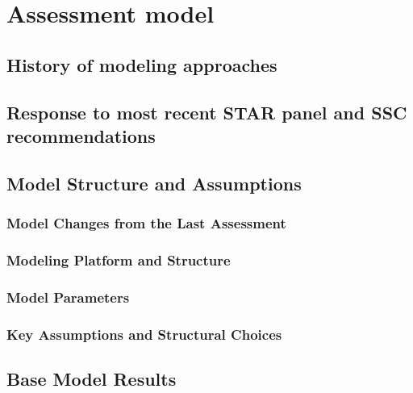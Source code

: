 \documentclass[
]{scrartcl}
\begin{document}
\newpage{}

\section{Assessment model}\label{assessment-model}

\subsection{History of modeling
approaches}\label{history-of-modeling-approaches}

\subsection{Response to most recent STAR panel and SSC
recommendations}\label{response-to-most-recent-star-panel-and-ssc-recommendations}

\subsection{Model Structure and
Assumptions}\label{model-structure-and-assumptions}

\subsubsection{Model Changes from the Last
Assessment}\label{model-changes-from-the-last-assessment}

\subsubsection{Modeling Platform and
Structure}\label{modeling-platform-and-structure}

\subsubsection{Model Parameters}\label{model-parameters}

\subsubsection{Key Assumptions and Structural
Choices}\label{key-assumptions-and-structural-choices}

\newpage{}

\subsection{Base Model Results}\label{base-model-results}
\end{document}
